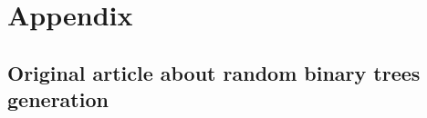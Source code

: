 \documentclass[twoside,openright,titlepage,fleqn,
	headinclude,11pt,a4paper,BCOR5mm,footinclude
	]{scrbook}
\begin{document}
\chapter{Appendix}

\section{Original article about random binary trees generation}



% 

% 
\end{document}
